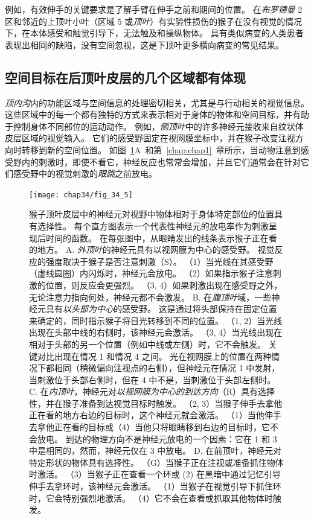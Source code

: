 例如，有效伸手的关键要求是了解手臂在伸手之前和期间的位置。
在\textit{布罗德曼} 2 区和邻近的上顶叶小叶（区域 5 或\textit{顶叶}）有实验性损伤的猴子在没有视觉的情况下，在本体感受和触觉引导下，无法触及和操纵物体。
具有类似病变的人类患者表现出相同的缺陷，没有空间忽视，这是下顶叶更多横向病变的常见结果。



\subsection{空间目标在后顶叶皮层的几个区域都有体现}

\textit{顶内沟}内的功能区域与空间信息的处理密切相关，尤其是与行动相关的视觉信息。
这些区域中的每一个都有独特的方式来表示相对于身体的物体和空间目标，并有助于控制身体不同部位的运动动作。
例如，\textit{侧顶叶}中的许多神经元接收来自纹状体皮层区域的视觉输入。
它们的感受野固定在视网膜坐标中，并在猴子改变注视方向时转移到新的空间位置。
如图~\ref{fig:34_5}A~和第~\ref{chap:chap1}~章所示，当动物注意到感受野内的刺激时，即使不看它，神经反应也常常会增加，并且它们通常会在针对它们感受野中的视觉刺激的\textit{眼跳}之前放电。


\begin{figure}[htbp]
	\centering
	\texttt{[image: chap34/fig\_34\_5]}
	\caption{猴子顶叶皮层中的神经元对视野中物体相对于身体特定部位的位置具有选择性。
		每个直方图表示一个代表性神经元的放电率作为刺激呈现后时间的函数。
		在每张图中，从眼睛发出的线条表示猴子正在看的地方。
		A. \textit{外顶叶}的神经元具有以视网膜为中心的感受野。
		视觉反应的强度取决于猴子是否注意刺激（S）。
		（1）当光线在其感受野（虚线圆圈）内闪烁时，神经元会放电。
		（2）如果指示猴子注意刺激的位置，则反应会更强烈。 
		（3, 4）如果刺激出现在感受野之外，无论注意力指向何处，神经元都不会激发。
		B. 在\textit{腹顶叶}域，一些神经元具有\textit{以头部为中心}的感受野。
		这是通过将头部保持在固定位置来确定的，同时指示猴子将目光转移到不同的位置。
		（1, 2）当光线出现在头部中线的右侧时，该神经元会激活。
		（3, 4）当光线出现在相对于头部的另一个位置（例如中线或左侧）时，它不会触发。
		 关键对比出现在情况 1 和情况 4 之间。
		 光在视网膜上的位置在两种情况下都相同（稍微偏向注视点的右侧），但神经元在情况 1 中发射，当刺激位于头部右侧时，但在 4 中不是，当刺激位于头部左侧时。 
		 C. 在\textit{内顶叶}，神经元对\textit{以视网膜为中心的到达方向}（R）具有选择性，并在猴子准备到达视觉目标时触发。
		 （2, 3）当猴子伸手去拿他正在看的地方右边的目标时，这个神经元就会激活。
		 （1）当他伸手去拿他正在看的目标或（4）当他只将眼睛移到右边的目标时，它不会放电。
		 到达的物理方向不是神经元放电的一个因素：它在 1 和 3 中是相同的，然而，神经元仅在 3 中放电。
		 D. 在前顶叶，神经元对特定形状的物体具有选择性。
		 （G）当猴子正在注视或准备抓住物体时激活。
		 （3）当猴子正在查看一个环或 (2) 在黑暗中通过记忆引导伸手去拿环时，该神经元会激活。
		 （1）当猴子在视觉引导下抓住环时，它会特别强烈地激活。
		 （4）它不会在查看或抓取其他物体时触发。}
	\label{fig:34_5}
\end{figure}



